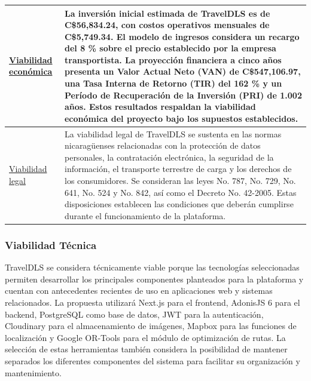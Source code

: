 \begin{table}[H]
\begin{tabularx}{\textwidth}{
			>{\RaggedRight\arraybackslash}p{3cm}
			>{\RaggedRight\arraybackslash}X
		}
		\hyperref[sec:viabilidad-economica]{Viabilidad económica} &
		La inversión inicial estimada de TravelDLS es de
		C\$56,834.24, con costos operativos mensuales de
		C\$5,749.34. El modelo de ingresos considera un recargo
		del 8 \% sobre el precio establecido por la empresa
		transportista. La proyección financiera a cinco años
		presenta un Valor Actual Neto (VAN) de C\$547,106.97,
		una Tasa Interna de Retorno (TIR) del 162 \% y un
		Período de Recuperación de la Inversión (PRI) de
		1.002 años. Estos resultados respaldan la viabilidad
		económica del proyecto bajo los supuestos establecidos. \\
		
		\midrule
		
		\hyperref[sec:viabilidad-legal]{Viabilidad legal} &
		La viabilidad legal de TravelDLS se sustenta en las
		normas nicaragüenses relacionadas con la protección
		de datos personales, la contratación electrónica,
		la seguridad de la información, el transporte terrestre
		de carga y los derechos de los consumidores.
		Se consideran las leyes No. 787, No. 729, No. 641,
		No. 524 y No. 842, así como el Decreto No. 42-2005.
		Estas disposiciones establecen las condiciones que
		deberán cumplirse durante el funcionamiento de
		la plataforma. \\
		
		\bottomrule
	\end{tabularx}
	
\end{table}


\subsubsection{Viabilidad Técnica}
\label{sec:viabilidad-tecnica}

TravelDLS se considera técnicamente viable porque las tecnologías seleccionadas permiten desarrollar los principales componentes planteados para la plataforma y cuentan con antecedentes recientes de uso en aplicaciones web y sistemas relacionados. La propuesta utilizará Next.js para el frontend, AdonisJS 6 para el backend, PostgreSQL como base de datos, JWT para la autenticación, Cloudinary para el almacenamiento de imágenes, Mapbox para las funciones de localización y Google OR-Tools para el módulo de optimización de rutas. La selección de estas herramientas también considera la posibilidad de mantener separados los diferentes componentes del sistema para facilitar su organización y mantenimiento.

